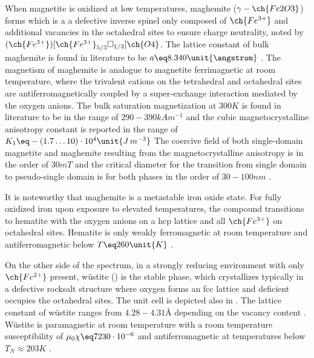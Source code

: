 \documentclass[\main/dresen_thesis.tex]{subfiles}
\begin{document}
  When magnetite is oxidized at low temperatures, maghemite ($\gamma-\ch{Fe2O3}$) forms which is a a defective inverse spinel only composed of $\ch{Fe^{3+}}$ and additional vacancies in the octahedral sites to ensure charge neutrality, noted by $(\ch{Fe^{3+}})[\ch{Fe^{3+}}_{5/3}\square_{1/3}]\ch{O4}$.
  The lattice constant of bulk maghemite is found in literature to be $a \eq 8.340 \unit{\angstrom}$ \cite{Cornell_2003_Their}.
  The magnetism of maghemite is analogue to magnetite ferrimagnetic at room temperature, where the trivalent cations on the tetrahedral and octahedral sites are antiferromagnetically coupled by a super-exchange interaction mediated by the oxygen anions.
  The bulk saturation magnetization at $300 \unit{K}$ is found in literature to be in the range of $290 - 390 \unit{kA m^{-1}}$ and the cubic magnetocrystalline anisotropy constant is reported in the range of $K_1 \eq -(1.7 \ldots 10) \cdot 10^{4} \unit{J \, m^{-3}}$ \cite{Cornell_2003_Their}
  The coercive field of both single-domain magnetite and maghemite resulting from the magnetocrystalline anisotropy is in the order of $30 \unit{mT}$ and the critical diameter for the transition from single domain to pseudo-single domain is for both phases in the order of $30 - 100 \unit{nm}$ \cite{Cornell_2003_Their}.

  It is noteworthy that maghemite is a metastable iron oxide state.
  For fully oxidized iron upon exposure to elevated temperatures, the compound transitions to hematite with the oxygen anions on a hcp lattice and all $\ch{Fe^{3+}}$ on octahedral sites.
  Hematite is only weakly ferromagnetic at room temperature and antiferromagnetic below $T \eq 260 \unit{K}$ \cite{Cornell_2003_Their}.

  On the other side of the spectrum, in a strongly reducing environment with only $\ch{Fe^{2+}}$ present, w\"ustite () is the stable phase, which crystallizes typically in a defective rocksalt structure where oxygen forms an fcc lattice and deficient  occupies the octahedral sites.
  The unit cell is depicted also in .
  The lattice constant of w\"ustite ranges from $4.28 - 4.31 \unit{\angstrom}$ depending on the vacancy content \cite{Cornell_2003_Their}.
  W\"ustite is paramagnetic at room temperature with a room temperature susceptibility of $\mu_0 \chi \eq 7230 \cdot 10^{-6}$ \cite{Lide_2004_Handb} and antiferromagnetic at temperatures below $T_N \approx 203 K$ \cite{Cornell_2003_Their}.
\end{document}
